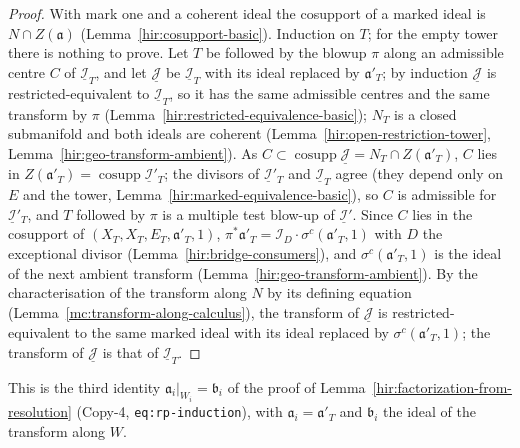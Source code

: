 \begin{proof}
\leanok
With mark one and a coherent ideal the cosupport of a marked ideal is \(N\cap Z(\mathfrak a)\) (Lemma~\ref{hir:cosupport-basic}). Induction on \(T\); for the empty tower
there is nothing to prove. Let \(T\) be followed by the blowup \(\pi\) along an admissible centre \(C\) of \(\underline{\mathcal I}_T\), and let \(\underline{\mathcal J}\) be
\(\underline{\mathcal I}_T\) with its ideal replaced by \(\mathfrak a'_T\); by induction \(\underline{\mathcal J}\) is restricted-equivalent to \(\underline{\mathcal I}_T\), so it has
the same admissible centres and the same transform by \(\pi\) (Lemma~\ref{hir:restricted-equivalence-basic}); \(N_T\) is a closed submanifold and both ideals are coherent
(Lemma~\ref{hir:open-restriction-tower}, Lemma~\ref{hir:geo-transform-ambient}). As \(C\subset\operatorname{cosupp}\underline{\mathcal J}=N_T\cap Z(\mathfrak a'_T)\), \(C\) lies in
\(Z(\mathfrak a'_T)=\operatorname{cosupp}\underline{\mathcal I}'_T\); the divisors of \(\underline{\mathcal I}'_T\) and \(\underline{\mathcal I}_T\) agree (they depend only on \(E\)
and the tower, Lemma~\ref{hir:marked-equivalence-basic}), so \(C\) is admissible for \(\underline{\mathcal I}'_T\), and \(T\) followed by \(\pi\) is a multiple test blow-up of
\(\underline{\mathcal I}'\). Since \(C\) lies in the cosupport of \((X_T,X_T,E_T,\mathfrak a'_T,1)\), \(\pi^*\mathfrak a'_T=\mathcal I_D\cdot\sigma^c(\mathfrak a'_T,1)\) with \(D\) the
exceptional divisor (Lemma~\ref{hir:bridge-consumers}), and \(\sigma^c(\mathfrak a'_T,1)\) is the ideal of the next ambient transform (Lemma~\ref{hir:geo-transform-ambient}).
By the characterisation of the transform along \(N\) by its defining equation (Lemma~\ref{mc:transform-along-calculus}), the transform of \(\underline{\mathcal J}\) is
restricted-equivalent to the same marked ideal with its ideal replaced by \(\sigma^c(\mathfrak a'_T,1)\); the transform of \(\underline{\mathcal J}\) is that of
\(\underline{\mathcal I}_T\).
\end{proof}
This is the third identity \(\mathfrak a_i|_{W_i}=\mathfrak b_i\) of the proof of Lemma~\ref{hir:factorization-from-resolution} (Copy-4, \texttt{eq:rp-induction}), with
\(\mathfrak a_i=\mathfrak a'_T\) and \(\mathfrak b_i\) the ideal of the transform along \(W\).

